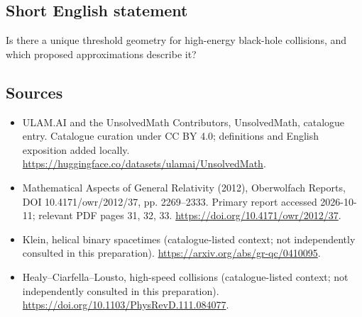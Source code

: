 \documentclass[11pt]{article}
\begin{document}
\subsection{Short English statement}
Is there a unique threshold geometry for high-energy black-hole collisions, and which proposed approximations describe it?
\subsection{Sources}
\begin{itemize}
\item[\hypertarget{source:statement:1}{S1}] ULAM.AI and the UnsolvedMath Contributors, UnsolvedMath, catalogue entry. Catalogue curation under CC BY 4.0; definitions and English exposition added locally.
\url{https://huggingface.co/datasets/ulamai/UnsolvedMath}.
\item[\hypertarget{source:statement:2}{S2}] Mathematical Aspects of General Relativity (2012), Oberwolfach Reports, DOI 10.4171/owr/2012/37, pp. 2269--2333. Primary report accessed 2026-10-11; relevant PDF pages 31, 32, 33.
\url{https://doi.org/10.4171/owr/2012/37}.
\item[\hypertarget{source:statement:3}{S3}] Klein, helical binary spacetimes (catalogue-listed context; not independently consulted in this preparation).
\url{https://arxiv.org/abs/gr-qc/0410095}.
\item[\hypertarget{source:statement:4}{S4}] Healy--Ciarfella--Lousto, high-speed collisions (catalogue-listed context; not independently consulted in this preparation).
\url{https://doi.org/10.1103/PhysRevD.111.084077}.
\end{itemize}
\label{end:statement}
\end{document}
